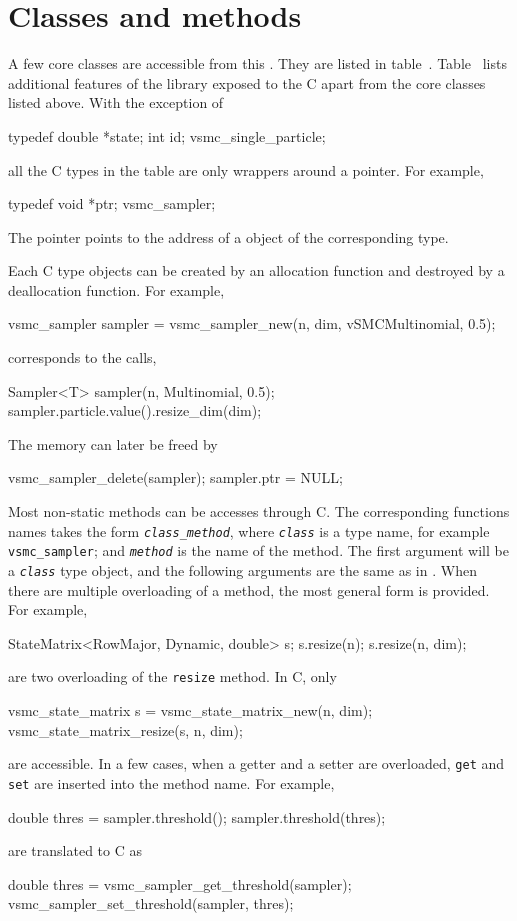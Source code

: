 \section{Classes and methods}
\label{sec:Classes and methods}

A few core classes are accessible from this \api. They are listed in
table~. Table~ lists additional
features of the library exposed to the C \api apart from the core classes
listed above. With the exception of
\begin{ccode}
  typedef {
      double *state;
      int id;
  } vsmc_single_particle;
\end{ccode}
all the C types in the table are only wrappers around a pointer. For example,
\begin{ccode}
  typedef {
      void *ptr;
  } vsmc_sampler;
\end{ccode}
The pointer points to the address of a \cpp object of the corresponding type.

Each C type objects can be created by an allocation function and destroyed by a
deallocation function. For example,
\begin{ccode}
  vsmc_sampler sampler = vsmc_sampler_new(n, dim, vSMCMultinomial, 0.5);
\end{ccode}
corresponds to the \cpp calls,
\begin{cppcode}
  Sampler<T> sampler(n, Multinomial, 0.5);
  sampler.particle.value().resize_dim(dim);
\end{cppcode}
The memory can later be freed by
\begin{ccode}
  vsmc_sampler_delete(sampler);
  sampler.ptr = NULL;
\end{ccode}
Most non-static methods can be accesses through C. The corresponding functions
names takes the form
\texttt{\textcolor{MRed}{\textit{class}}\_\textcolor{MRed}{\textit{method}}},
where \texttt{\textcolor{MRed}{\textit{class}}} is a type name, for example
\verb|vsmc_sampler|; and \texttt{\textcolor{MRed}{\textit{method}}} is the name
of the method. The first argument will be a
\texttt{\textcolor{MRed}{\textit{class}}} type object, and the following
arguments are the same as in \cpp. When there are multiple overloading of a
method, the most general form is provided. For example,
\begin{cppcode}
  StateMatrix<RowMajor, Dynamic, double> s;
  s.resize(n);
  s.resize(n, dim);
\end{cppcode}
are two overloading of the \verb|resize| method. In C, only
\begin{ccode}
  vsmc_state_matrix s = vsmc_state_matrix_new(n, dim);
  vsmc_state_matrix_resize(s, n, dim);
\end{ccode}
are accessible. In a few cases, when a getter and a setter are overloaded,
\verb|get| and \verb|set| are inserted into the method name. For example,
\begin{cppcode}
  double thres = sampler.threshold();
  sampler.threshold(thres);
\end{cppcode}
are translated to C as
\begin{ccode}
  double thres = vsmc_sampler_get_threshold(sampler);
  vsmc_sampler_set_threshold(sampler, thres);
\end{ccode}

